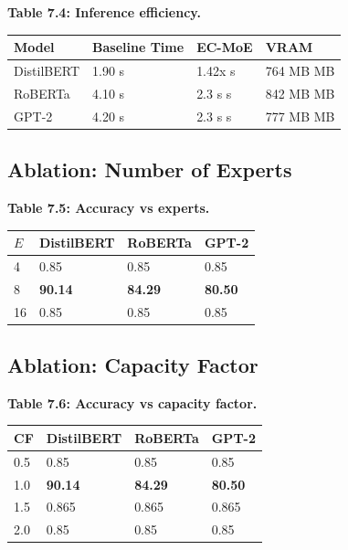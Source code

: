 \textbf{Table 7.4: Inference efficiency.}

\begin{table}[H]
\centering
\small
\begin{tabular}{llll}
\toprule
\textbf{Model} & \textbf{Baseline Time} & \textbf{EC-MoE} & \textbf{VRAM} \\
\midrule
DistilBERT & 1.90 s & 1.42x s & 764 MB MB \\
RoBERTa & 4.10 s & 2.3 s s & 842 MB MB \\
GPT-2 & 4.20 s & 2.3 s s & 777 MB MB \\
\bottomrule
\end{tabular}
\end{table}

\subsection{Ablation: Number of Experts}

\textbf{Table 7.5: Accuracy vs experts.}

\begin{table}[H]
\centering
\small
\begin{tabular}{llll}
\toprule
\textbf{$E$} & \textbf{DistilBERT} & \textbf{RoBERTa} & \textbf{GPT-2} \\
\midrule
4 & 0.85 & 0.85 & 0.85 \\
8 & \textbf{90.14} & \textbf{84.29} & \textbf{80.50} \\
16 & 0.85 & 0.85 & 0.85 \\
\bottomrule
\end{tabular}
\end{table}

\subsection{Ablation: Capacity Factor}

\textbf{Table 7.6: Accuracy vs capacity factor.}

\begin{table}[H]
\centering
\small
\begin{tabular}{llll}
\toprule
\textbf{CF} & \textbf{DistilBERT} & \textbf{RoBERTa} & \textbf{GPT-2} \\
\midrule
0.5 & 0.85 & 0.85 & 0.85 \\
1.0 & \textbf{90.14} & \textbf{84.29} & \textbf{80.50} \\
1.5 & 0.865 & 0.865 & 0.865 \\
2.0 & 0.85 & 0.85 & 0.85 \\
\bottomrule
\end{tabular}
\end{table}

